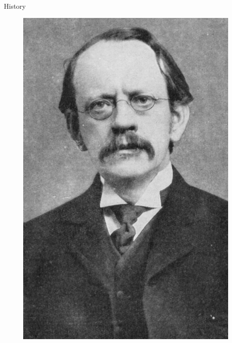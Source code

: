 \documentclass{beamer}
\begin{document}
{\begin{frame}{History}
\begin{figure}
        \includegraphics[scale=0.05]{figures/Thomson.jpg}

\end{figure}
\end{frame}}
\end{document}
